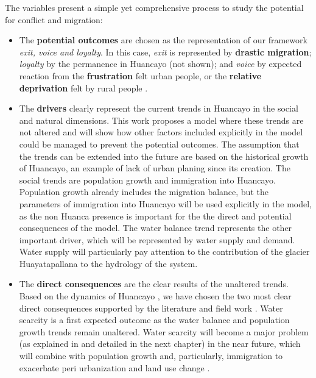 \documentclass{article}
\begin{document}
The variables present a simple yet comprehensive process to study the potential for conflict and migration:
\begin{itemize}
\item The {\bf potential outcomes} are chosen as the representation of our framework \emph{exit, voice and loyalty}\cite{hirschman_exit_1970}. In this case, \emph{exit} is represented by {\bf drastic migration}; \emph{loyalty} by the permanence in Huancayo (not shown); and \emph{voice} by expected reaction from the {\bf frustration} felt urban people, or the {\bf relative deprivation} felt by rural people . 

\item The {\bf drivers} clearly represent the current trends in Huancayo  in the social and natural dimensions. This work proposes a model where these trends are not altered and will show how other factors included explicitly in the model could be managed to prevent the potential outcomes. The assumption that the trends can be extended into the future are based on the historical growth of Huancayo, an example of lack of urban planing since its creation. The social trends are population growth and immigration into Huancayo. Population growth already includes the migration balance, but the parameters of immigration into Huancayo will be used explicitly in the model, as the non Huanca presence is important for the the direct and potential consequences of the model. The water balance trend represents the other important driver, which will be represented by water supply and demand. Water supply will particularly pay attention to the contribution of the glacier Huayatapallana to the hydrology of the system. 

\item The {\bf direct consequences} are the clear results of the unaltered trends. Based on the dynamics of Huancayo , we have chosen the two most clear direct consequences supported by the literature and field work \cite{haller_huancayo_2013,ho_2012,haller_vivid_2012}. Water scarcity is a first expected outcome as the water balance and population growth trends remain unaltered. Water scarcity will become a major problem (as explained in \cite{carlos_riesgos_2012} and detailed in the next chapter) in the near future, which will combine with population growth and, particularly, immigration to exacerbate peri urbanization and land use change \cite{haller_huancayo_2013,haller_vivid_2012,ho_2012}. 


\end{itemize}
\end{document}
